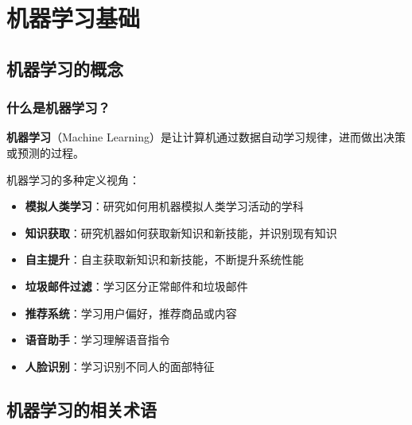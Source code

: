 \chapter{机器学习基础}

\section{机器学习的概念}

\subsection{什么是机器学习？}

\begin{conceptbox}
\textbf{机器学习}（Machine Learning）是让计算机通过数据自动学习规律，进而做出决策或预测的过程。
\end{conceptbox}

机器学习的多种定义视角：
\begin{itemize}[leftmargin=2em,itemsep=0pt]
    \item \textbf{模拟人类学习}：研究如何用机器模拟人类学习活动的学科
    \item \textbf{知识获取}：研究机器如何获取新知识和新技能，并识别现有知识
    \item \textbf{自主提升}：自主获取新知识和新技能，不断提升系统性能
\end{itemize}

\begin{examplebox}[例子：机器学习的生活应用]
\begin{itemize}[itemsep=0pt]
    \item \textbf{垃圾邮件过滤}：学习区分正常邮件和垃圾邮件
    \item \textbf{推荐系统}：学习用户偏好，推荐商品或内容
    \item \textbf{语音助手}：学习理解语音指令
    \item \textbf{人脸识别}：学习识别不同人的面部特征
\end{itemize}
\end{examplebox}

\section{机器学习的相关术语}

